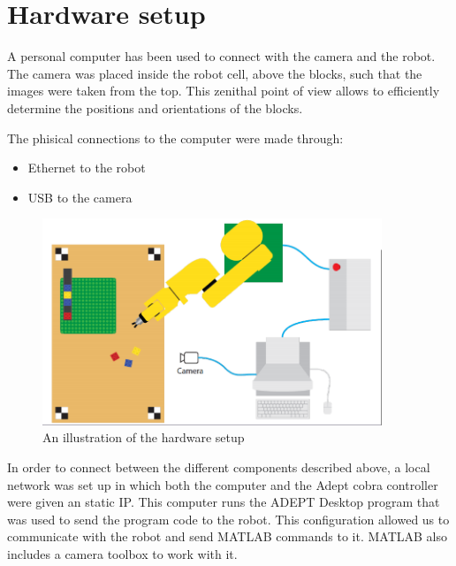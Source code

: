 \chapter{Hardware setup}\label{ch:hardware}
A personal computer has been used to connect with the camera and the robot. The camera was placed inside the robot cell, above the blocks, such that the images were taken from the top. This zenithal point of view allows to efficiently determine the positions and orientations of the blocks. 

The phisical connections to the computer were made through: 
\begin{itemize}
	\item Ethernet to the robot  
	\item USB to the camera 
\end{itemize}

\begin{figure}[hb]
\centering
\includegraphics[width=4in]{figures/robotCellDesign.png}
\caption[robot Cell Design]
{An illustration of the hardware setup}
\end{figure}

In order to connect between the different components described above, a local network was set up in which both the computer and the Adept cobra controller were given an static IP. This computer runs the ADEPT Desktop program that was used to send the program code to the robot. This configuration allowed us to communicate with the robot and send MATLAB commands to it. MATLAB also includes a camera toolbox to work with it. 
